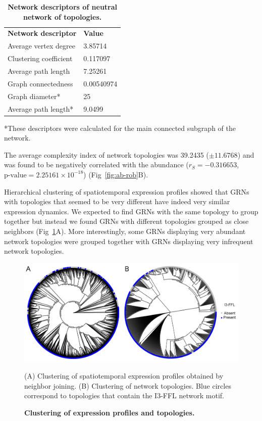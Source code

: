 \documentclass[10pt,letterpaper]{article}
\newlength\savedwidth
\newcommand\thickhline{\noalign{\global\savedwidth\arrayrulewidth\global\arrayrulewidth 2pt}%
\hline
\noalign{\global\arrayrulewidth\savedwidth}}
\begin{document}
\begin{table}[!ht]
 \centering
 \caption{{\bf Network descriptors of neutral network of topologies.}}
 \begin{tabular}{|l|l|}
 \hline
 {\bf Network descriptor} & {\bf Value}\\ \thickhline
 Average vertex degree  & 3.85714 \\ \hline
 Clustering coefficient \cite{Watts1998} & 0.117097 \\ \hline
 Average path length    & 7.25261       \\ \hline
 Graph connectedness    & 0.00540974    \\ \hline
 Graph diameter*        & 25            \\ \hline
 Average path length*   & 9.0499        \\ \hline
 \end{tabular}
 \begin{flushleft} *These descriptors were calculated for the main connected
 subgraph of the network.
 \end{flushleft}
 \label{table1}
 \end{table}

The average complexity index of network topologies was 39.2435 ($\pm 11.6768$)
and was found to be negatively correlated with the abundance ($r_S = -0.316653$,
$\text{p-value} = 2.25161\times10^{-18}$) (Fig~\ref{fig:ab-rob}B).

Hierarchical clustering of spatiotemporal expression profiles showed that GRNs
with topologies that seemed to be very different have indeed very similar
expression dynamics. We expected to find GRNs with the same topology to group
together but instead we found GRNs with different topologies grouped as close
neighbors (Fig~\ref{fig:clustering}A). More interestingly, some GRNs displaying
very abundant network topologies were grouped together with GRNs displaying
very infrequent network topologies.

\begin{figure}[!h]
 \includegraphics[width=\textwidth]{figures/results/Fig7}
 \caption{\bf Clustering of expression profiles and topologies.}
 (A) Clustering of spatiotemporal expression profiles obtained by
 neighbor joining. (B) Clustering of network topologies. Blue circles
 correspond to topologies that contain the I3-FFL network motif.
 \label{fig:clustering}
\end{figure}
\end{document}
